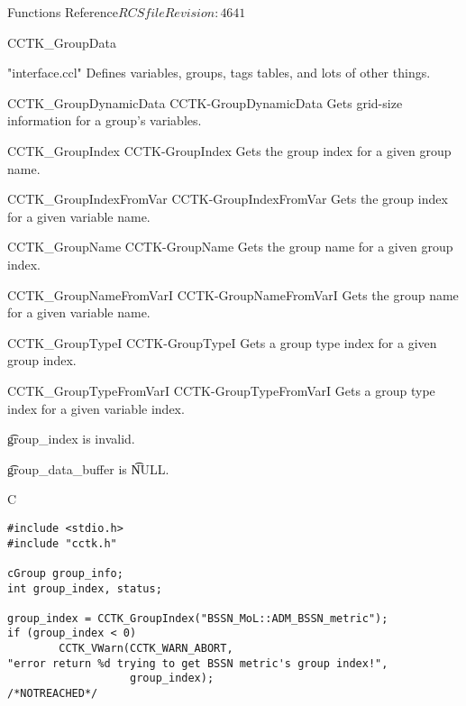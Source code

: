 \begin{cactuspart}{ Functions Reference}{$RCSfile$}{$Revision: 4641 $}
\begin{FunctionDescription}{CCTK\_GroupData}
\begin{SeeAlsoSection}
\begin{SeeAlso}{"interface.ccl"}
Defines variables, groups, tags tables, and lots of other things.
\end{SeeAlso}
\begin{SeeAlso2} {CCTK\_GroupDynamicData} {CCTK-GroupDynamicData}
Gets grid-size information for a group's variables.
\end{SeeAlso2}
\begin{SeeAlso2} {CCTK\_GroupIndex} {CCTK-GroupIndex}
Gets the group index for a given group name.
\end{SeeAlso2}
\begin{SeeAlso2} {CCTK\_GroupIndexFromVar} {CCTK-GroupIndexFromVar}
Gets the group index for a given variable name.
\end{SeeAlso2}
\begin{SeeAlso2} {CCTK\_GroupName} {CCTK-GroupName}
Gets the group name for a given group index.
\end{SeeAlso2}
\begin{SeeAlso2} {CCTK\_GroupNameFromVarI} {CCTK-GroupNameFromVarI}
Gets the group name for a given variable name.
\end{SeeAlso2}
\begin{SeeAlso2} {CCTK\_GroupTypeI} {CCTK-GroupTypeI}
Gets a group type index for a given group index.
\end{SeeAlso2}
\begin{SeeAlso2} {CCTK\_GroupTypeFromVarI} {CCTK-GroupTypeFromVarI}
Gets a group type index for a given variable index.
\end{SeeAlso2}
\end{SeeAlsoSection}

\begin{ErrorSection}
\begin{Error}{-1}
{\t group\_index} is invalid.
\end{Error}
\begin{Error}{-2}
{\t group\_data\_buffer} is {\t NULL}.
\end{Error}
\end{ErrorSection}

\begin{ExampleSection}
\begin{Example}{C}
\begin{verbatim}
#include <stdio.h>
#include "cctk.h"

cGroup group_info;
int group_index, status;

group_index = CCTK_GroupIndex("BSSN_MoL::ADM_BSSN_metric");
if (group_index < 0)
        CCTK_VWarn(CCTK_WARN_ABORT,
"error return %d trying to get BSSN metric's group index!",
                   group_index);                                /*NOTREACHED*/


\end{verbatim}
\end{Example}
\end{ExampleSection}
\end{FunctionDescription}
\end{cactuspart}
